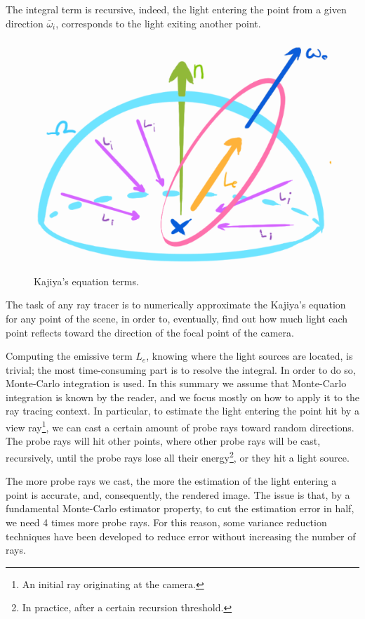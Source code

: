 \documentclass[11pt,a4paper,twocolumn]{article}
\begin{document}
The integral term is recursive, indeed, the light entering the point from a given direction $\bar{\omega}_i$, corresponds to the light exiting another point.

\begin{figure}[H]
    \centering 
    \includegraphics[width=\textwidth*\real{0.225}]{Images/kajiya_visual.png}
    \caption{Kajiya's equation terms.}
    \label{fig:kajiya_recursiveness}
\end{figure}

The task of any ray tracer is to numerically approximate the Kajiya's equation for any point of the scene, in order to, eventually, find out how much light each point reflects toward the direction of the focal point of the camera.

Computing the emissive term $L_e$, knowing where the light sources are located, is trivial; the most time-consuming part is to resolve the integral. In order to do so, Monte-Carlo integration is used. In this summary we assume that Monte-Carlo integration is known by the reader, and we focus mostly on how to apply it to the ray tracing context. In particular, to estimate the light entering the point hit by a view ray\footnote{An initial ray originating at the camera.}, we can cast a certain amount of probe rays toward random directions. The probe rays will hit other points, where other probe rays will be cast, recursively, until the probe rays lose all their energy\footnote{In practice, after a certain recursion threshold.}, or they hit a light source.

The more probe rays we cast, the more the estimation of the light entering a point is accurate, and, consequently, the rendered image. The issue is that, by a fundamental Monte-Carlo estimator property, to cut the estimation error in half, we need 4 times more probe rays. For this reason, some variance reduction techniques have been developed to reduce error without increasing the number of rays.
\end{document}
